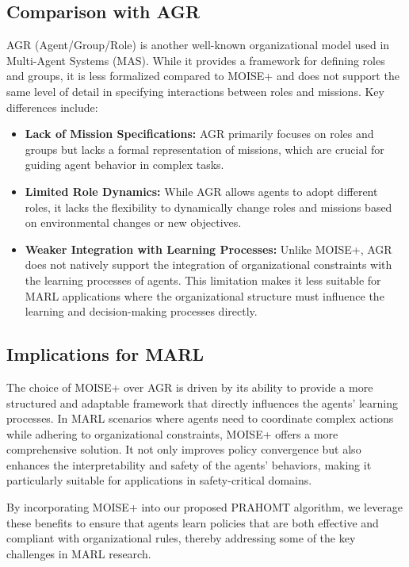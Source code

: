 \documentclass[sigconf,anonymous]{aamas}
\begin{document}
\subsection{Comparison with AGR}
AGR (Agent/Group/Role) is another well-known organizational model used in Multi-Agent Systems (MAS). While it provides a framework for defining roles and groups, it is less formalized compared to MOISE+ and does not support the same level of detail in specifying interactions between roles and missions. Key differences include:
\begin{itemize}
    \item \textbf{Lack of Mission Specifications:} AGR primarily focuses on roles and groups but lacks a formal representation of missions, which are crucial for guiding agent behavior in complex tasks.
    \item \textbf{Limited Role Dynamics:} While AGR allows agents to adopt different roles, it lacks the flexibility to dynamically change roles and missions based on environmental changes or new objectives.
    \item \textbf{Weaker Integration with Learning Processes:} Unlike MOISE+, AGR does not natively support the integration of organizational constraints with the learning processes of agents. This limitation makes it less suitable for MARL applications where the organizational structure must influence the learning and decision-making processes directly.
\end{itemize}

\subsection{Implications for MARL}
The choice of MOISE+ over AGR is driven by its ability to provide a more structured and adaptable framework that directly influences the agents' learning processes. In MARL scenarios where agents need to coordinate complex actions while adhering to organizational constraints, MOISE+ offers a more comprehensive solution. It not only improves policy convergence but also enhances the interpretability and safety of the agents' behaviors, making it particularly suitable for applications in safety-critical domains.

By incorporating MOISE+ into our proposed PRAHOMT algorithm, we leverage these benefits to ensure that agents learn policies that are both effective and compliant with organizational rules, thereby addressing some of the key challenges in MARL research.
\end{document}
